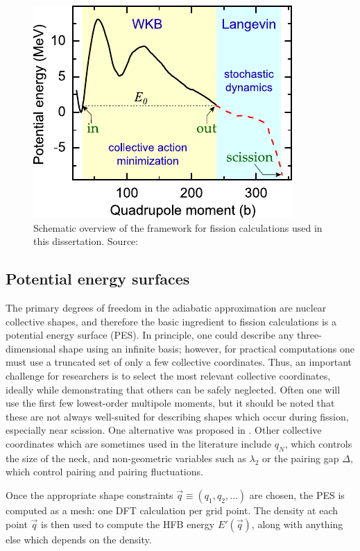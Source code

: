 \begin{figure}
	\centering
	\includegraphics[width=0.5\linewidth]{TeX_files/methods_overview}
	\caption[Schematic overview of the framework for fission calculations used in this dissertation]{Schematic overview of the framework for fission calculations used in this dissertation. Source: \cite{Sadhukhan2016}}
	\label{fig:methodsoverview}
\end{figure}

\subsection{Potential energy surfaces}
The primary degrees of freedom in the adiabatic approximation are nuclear collective shapes, and therefore the basic ingredient to fission calculations is a potential energy surface (PES). In principle, one could describe any three-dimensional shape using an infinite basis; however, for practical computations one must use a truncated set of only a few collective coordinates. Thus, an important challenge for researchers is to select the most relevant collective coordinates, ideally while demonstrating that others can be safely neglected. Often one will use the first few lowest-order multipole moments, but it should be noted that these are not always well-suited for describing shapes which occur during fission, especially near scission. One alternative was proposed in \cite{Younes2012}. Other collective coordinates which are sometimes used in the literature include $q_N$, which controls the size of the neck, and non-geometric variables such as $\lambda_2$ or the pairing gap $\Delta$, which control pairing and pairing fluctuations.

Once the appropriate shape constraints $\vec{q}\equiv(q_1, q_2, \dots)$ are chosen, the PES is computed as a mesh: one DFT calculation per grid point. The density at each point $\vec{q}$ is then used to compute the HFB energy $E'(\vec{q})$, along with anything else which depends on the density.

